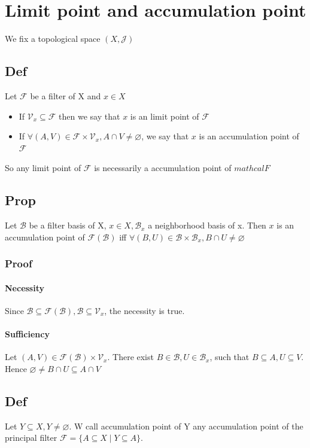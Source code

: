 \documentclass{book}
\begin{document}
\chapter{Limit point and accumulation point}
We fix a topological space $(X,\mathcal{J})$
\section{Def}
Let $\mathcal{F}$ be a filter of X and $x\in X$\begin{itemize}
    \item If $\mathcal{V}_x\subseteq \mathcal{F}$ then we say that $x$ is an limit point of $\mathcal{F}$
    \item If $\forall (A,V)\in\mathcal{F}\times \mathcal{V}_x,A\cap V\not=\varnothing$, we say that $x$ is an accumulation point of $\mathcal{F}$
\end{itemize} 
So any limit point of $\mathcal{F}$ is necessarily a accumulation point of $mathcal{F}$ 
\section{Prop}
Let $\mathscr{B}$ be a filter basis of X, $x\in X,\mathscr{B}_x$ a neighborhood basis of x. Then $x$ is an accumulation point of $\mathcal{F}(\mathscr{B})$ iff $\forall (B,U)\in \mathscr{B}\times \mathscr{B}_x, B\cap U\not =\varnothing$
\subsection*{Proof}
\subsubsection{Necessity}
Since $\mathscr{B}\subseteq \mathcal{F}(\mathscr{B}),\mathscr{B}\subseteq \mathcal{V}_x$, the necessity is true.
\subsubsection{Sufficiency}
Let $(A,V)\in \mathcal{F}(\mathscr{B})\times\mathcal{V}_x$. There exist $B\in \mathscr{B},U\in \mathscr{B}_x$, such that $B\subseteq A, U\subseteq V$. Hence $\varnothing \not=B\cap U\subseteq A\cap V$
\section{Def}
Let $Y\subseteq X, Y\not=\varnothing$. W call accumulation point of Y any accumulation point of the principal filter $\mathcal{F}=\{A\subseteq X\mid Y\subseteq A\}$. 
\end{document}
